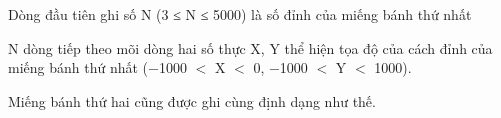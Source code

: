 Dòng đầu tiên ghi số N (3 ≤ N ≤ 5000) là số đỉnh của miếng bánh thứ nhất  

   N dòng tiếp theo mõi dòng hai số thực X, Y thể hiện tọa độ của cách đỉnh của miếng bánh thứ nhất (−1000 $<$ X $<$ 0, −1000 $<$ Y $<$ 1000).  

   Miếng bánh thứ hai cũng được ghi cùng định dạng như thế.  

\